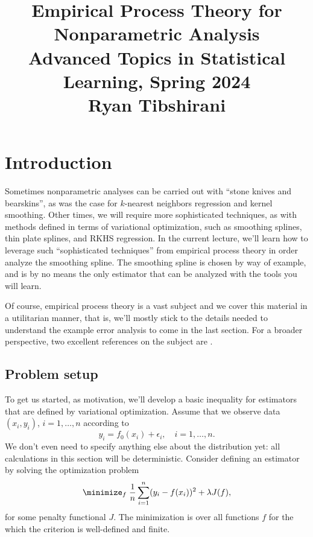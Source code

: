 \documentclass{article}
\title{Empirical Process Theory for Nonparametric Analysis \\ \smallskip
\large Advanced Topics in Statistical Learning, Spring 2024 \\ \smallskip
Ryan Tibshirani}
\author{}
\date{}
\begin{document}
\maketitle
\RaggedRight
\vspace{-50pt}

\section{Introduction}

Sometimes nonparametric analyses can be carried out with ``stone knives and 
bearskins'', as was the case for $k$-nearest neighbors regression and kernel 
smoothing. Other times, we will require more sophisticated techniques, as with
methods defined in terms of variational optimization, such as smoothing splines,
thin plate splines, and RKHS regression. In the current lecture, we'll learn how
to leverage such ``sophisticated techniques'' from empirical process theory in
order analyze the smoothing spline. The smoothing spline is chosen by way of
example, and is by no means the only estimator that can be analyzed with the
tools you will learn. 

Of course, empirical process theory is a vast subject and we cover this material
in a utilitarian manner, that is, we'll mostly stick to the details needed to
understand the example error analysis to come in the last section. For a broader
perspective, two excellent references on the subject are
\citet{vandegeer2000empirical, wainwright2019high}.         

\subsection{Problem setup}

\def\TV{\mathrm{TV}}

To get us started, as motivation, we'll develop a basic inequality for
estimators that are defined by variational optimization. Assume that we observe
data $(x_i,y_i)$, $i=1,\dots,n$ according to
\begin{equation}
\label{eq:model}
y_i = f_0(x_i) + \epsilon_i, \quad i=1,\dots,n.
\end{equation}
We don't even need to specify anything else about the distribution yet: all 
calculations in this section will be deterministic. Consider defining an
estimator by solving the optimization problem 
\begin{equation}
\label{eq:variational_opt}
\minimize_f \; \frac{1}{n} \sum_{i=1}^n (y_i - f(x_i))^2 + \lambda J(f), 
\end{equation}
for some penalty functional $J$. The minimization is over all functions $f$ for
the which the criterion is well-defined and finite. 
\end{document}

